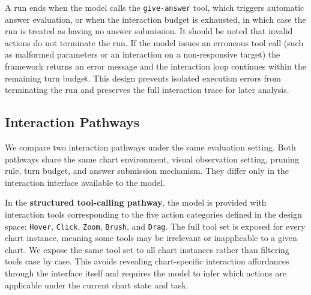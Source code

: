 \documentclass[review,journal,hideappendix]{vgtc} %
\begin{document}
A run ends when the model calls the \texttt{give-answer} tool, which triggers automatic answer evaluation, or when the interaction budget is exhausted, in which case the run is treated as having no answer submission. It should be noted that invalid actions do not terminate the run. If the model issues an erroneous tool call (such as malformed parameters or an interaction on a non-responsive target) the framework returns an error message and the interaction loop continues within the remaining turn budget. This design prevents isolated execution errors from terminating the run and preserves the full interaction trace for later analysis.

\subsection{Interaction Pathways}

We compare two interaction pathways under the same evaluation setting. Both pathways share the same chart environment, visual observation setting, pruning rule, turn budget, and answer submission mechanism. They differ only in the interaction interface available to the model.

In the \textbf{structured tool-calling pathway}, the model is provided with interaction tools corresponding to the five action categories defined in the design space: \texttt{Hover}, \texttt{Click}, \texttt{Zoom}, \texttt{Brush}, and \texttt{Drag}. The full tool set is exposed for every chart instance, meaning some tools may be irrelevant or inapplicable to a given chart. We expose the same tool set to all chart instances rather than filtering tools case by case. This avoids revealing chart-specific interaction affordances through the interface itself and requires the model to infer which actions are applicable under the current chart state and task.
\end{document}
